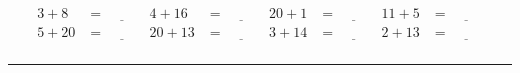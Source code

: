 \documentclass{article}
\begin{document}
\begin{sloppy}
\begin{align*}
    {3} + {8} &= \underline{\hspace{1cm}} & {4} + {16} &= \underline{\hspace{1cm}} & {20} + {1} &= \underline{\hspace{1cm}} & {11} + {5} &= \underline{\hspace{1cm}} \\
    {5} + {20} &= \underline{\hspace{1cm}} & {20} + {13} &= \underline{\hspace{1cm}} & {3} + {14} &= \underline{\hspace{1cm}} & {2} + {13} &= \underline{\hspace{1cm}} \\
\end{align*}
\hrule
\end{sloppy}
\end{document}
